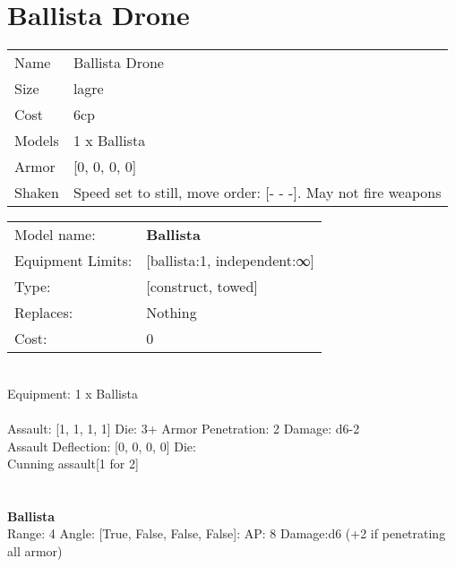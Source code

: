 \pagebreak\pagebreak

\section{ Ballista Drone }

\begin{tabular}{ll}
  Name & Ballista Drone \\
  Size & lagre\\
  Cost & 6cp\\
  Models & 1 x Ballista\\
  Armor & [0, 0, 0, 0]\\
  Shaken & Speed set to still, move order: [- - -]. May not fire weapons\\
\end{tabular}

\noindent 

\noindent
\begin{tabular}{ll}
Model name: &{\bf Ballista } \\
Equipment Limits: &[ballista:1, independent:∞] \\
Type: &[construct, towed] \\
Replaces: &Nothing \\
Cost: & 0\\
\end{tabular}
\ \\
Equipment: 1 x Ballista \\
\ \\
Assault: [1, 1, 1, 1] Die: 3+ Armor Penetration: 2 Damage: d6-2 \\
Assault Deflection: [0, 0, 0, 0] Die: \\
\indent Cunning assault[1 for 2]\\ 
 
\ \\

\ \\
{\bf Ballista } \\



Range: 4  Angle: [True, False, False, False]: AP: 8 Damage:d6 (+2 if penetrating all armor) \\




 
\ \\



